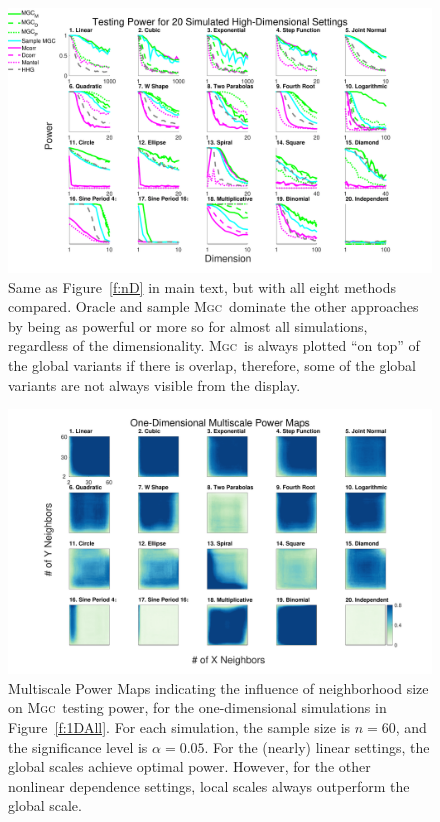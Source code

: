 \documentclass[11pt]{article}
\providecommand{\sct}[1]{{\normalfont\textsc{#1}}}
\newcommand{\Mgc}{\sct{Mgc}}
\begin{document}
\begin{figure}[htbp]
\includegraphics[width=1.0\textwidth]{Figures/FigHDPowerAll}
\caption{
Same as Figure~\ref{f:nD} in main text, but with all eight methods compared. Oracle and sample \Mgc~dominate the other approaches by being as powerful or more so for almost all simulations, regardless of the dimensionality. \Mgc~is always plotted ``on top'' of the global variants if there is overlap, therefore, some of the global variants are not always visible from the display.}
%
%
%
\label{f:nDAll}
\end{figure}


\begin{figure}[htbp]
\includegraphics[width=1.0\textwidth]{Figures/Fig1DHeat}
\caption{Multiscale Power Maps indicating the influence of neighborhood size on \Mgc~testing power, for the one-dimensional simulations in Figure~\ref{f:1DAll}. For each simulation,  the sample size is $n=60$, and the significance level is $\alpha=0.05$. For the (nearly) linear settings, the global scales achieve optimal power.  However, for the other nonlinear dependence settings, local scales always outperform the global scale.}
\label{f:powermaps1}
\end{figure}
\end{document}
